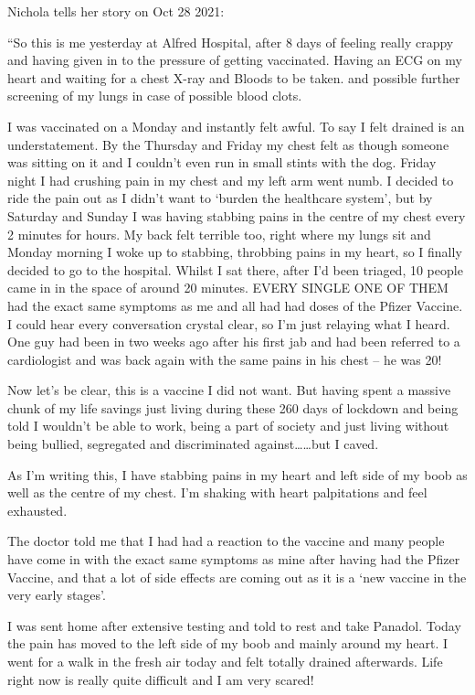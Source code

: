 Nichola tells her story on Oct 28 2021: 

“So this is me yesterday at Alfred Hospital, after 8 days of feeling really
crappy and having given in to the pressure of getting vaccinated. Having an ECG
on my heart and waiting for a chest X-ray and Bloods to be taken. and possible
further screening of my lungs in case of possible blood clots.

I was vaccinated on a Monday and instantly felt awful. To say I felt drained is
an understatement. By the Thursday and Friday my chest felt as though someone
was sitting on it and I couldn’t even run in small stints with the dog. Friday
night I had crushing pain in my chest and my left arm went numb. I decided to
ride the pain out as I didn’t want to ‘burden the healthcare system’, but by
Saturday and Sunday I was having stabbing pains in the centre of my chest every
2 minutes for hours. My back felt terrible too, right where my lungs sit and
Monday morning I woke up to stabbing, throbbing pains in my heart, so I finally
decided to go to the hospital. Whilst I sat there, after I’d been triaged, 10
people came in in the space of around 20 minutes. EVERY SINGLE ONE OF THEM had
the exact same symptoms as me and all had had doses of the Pfizer Vaccine. I
could hear every conversation crystal clear, so I’m just relaying what I
heard. One guy had been in two weeks ago after his first jab and had been
referred to a cardiologist and was back again with the same pains in his chest –
he was 20!

Now let’s be clear, this is a vaccine I did not want. But having spent a massive
chunk of my life savings just living during these 260 days of lockdown and being
told I wouldn’t be able to work, being a part of society and just living without
being bullied, segregated and discriminated against……but I caved.

As I’m writing this, I have stabbing pains in my heart and left side of my boob
as well as the centre of my chest. I’m shaking with heart palpitations and feel
exhausted.

The doctor told me that I had had a reaction to the vaccine and many people have
come in with the exact same symptoms as mine after having had the Pfizer
Vaccine, and that a lot of side effects are coming out as it is a ‘new vaccine
in the very early stages’.

I was sent home after extensive testing and told to rest and take Panadol. Today
the pain has moved to the left side of my boob and mainly around my heart. I
went for a walk in the fresh air today and felt totally drained afterwards. Life
right now is really quite difficult and I am very scared!

